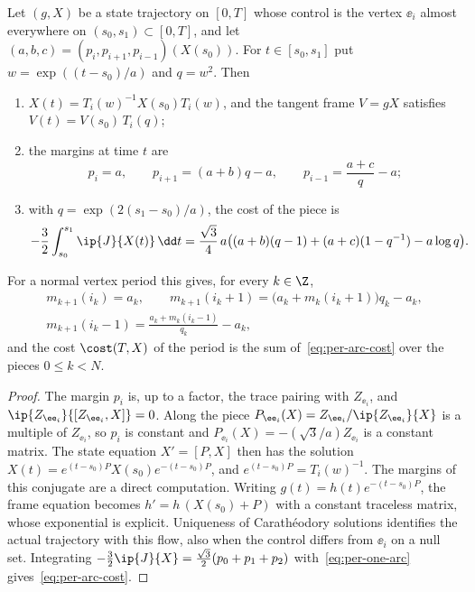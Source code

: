 \begin{lemma}\label{lem:one-arc}
Let $(g,X)$ be a state trajectory on $[0,T]$ whose control is the vertex $\ee_i$ almost
everywhere on $(s_0,s_1)\subset[0,T]$, and let $(a,b,c)=(p_i,p_{i+1},p_{i-1})(X(s_0))$. For
$t\in[s_0,s_1]$ put $w=\exp((t-s_0)/a)$ and $q=w^2$. Then
\begin{enumerate}[label=\textup{(\alph*)}]
\item $X(t)=T_i(w)^{-1}X(s_0)T_i(w)$, and the tangent frame $V=gX$ satisfies
  $V(t)=V(s_0)\,T_i(q)$;
\item the margins at time $t$ are
  \begin{equation}\label{eq:per-one-arc}
    p_i=a,\qquad p_{i+1}=(a+b)q-a,\qquad p_{i-1}=\frac{a+c}{q}-a;
  \end{equation}
\item with $q=\exp(2(s_1-s_0)/a)$, the cost of the piece is
  \begin{equation}\label{eq:per-arc-cost}
    -\frac32\int_{s_0}^{s_1}\ip{J}{X(t)}\,\dd t
    =\frac{\sqrt3}{4}\,a\bigl((a+b)(q-1)+(a+c)(1-q^{-1})-a\log q\bigr).
  \end{equation}
\end{enumerate}
For a normal vertex period this gives, for every $k\in\Z$,
\begin{gather*}
  m_{k+1}(i_k)=a_k,\qquad m_{k+1}(i_k+1)=\bigl(a_k+m_k(i_k+1)\bigr)q_k-a_k,\\
  m_{k+1}(i_k-1)=\frac{a_k+m_k(i_k-1)}{q_k}-a_k,
\end{gather*}
and the cost $\cost(T,X)$ of the period is the sum of~\eqref{eq:per-arc-cost} over the pieces
$0\le k<N$.
\end{lemma}

\begin{proof}
The margin $p_i$ is, up to a factor, the trace pairing with $Z_{\ee_i}$, and
$\ip{Z_{\ee_i}}{[Z_{\ee_i},X]}=0$. Along the piece $P_{\ee_i}(X)=Z_{\ee_i}/\ip{Z_{\ee_i}}{X}$ is a
multiple of $Z_{\ee_i}$, so $p_i$ is constant and $P_{\ee_i}(X)=-(\sqrt3/a)Z_{\ee_i}$ is a constant
matrix. The state equation $X'=[P,X]$ then has the solution
$X(t)=e^{(t-s_0)P}X(s_0)e^{-(t-s_0)P}$, and $e^{(t-s_0)P}=T_i(w)^{-1}$. The margins of this
conjugate are a direct computation. Writing
$g(t)=h(t)e^{-(t-s_0)P}$, the frame equation becomes $h'=h\,(X(s_0)+P)$ with a constant
traceless matrix, whose exponential is explicit. Uniqueness of Carath\'eodory solutions
identifies the actual trajectory with this flow, also when the control differs from $\ee_i$ on
a null set. Integrating $-\frac32\ip{J}{X}=\frac{\sqrt3}{2}(p_0+p_1+p_2)$ with~\eqref{eq:per-one-arc} gives~\eqref{eq:per-arc-cost}.
\end{proof}

